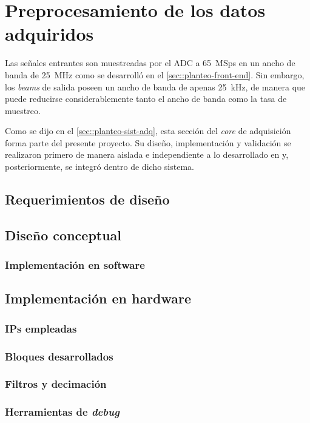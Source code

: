 \documentclass[../../main.tex]{subfiles}
\begin{document}
\graphicspath{{./figures}}
\chapter{Preprocesamiento de los datos adquiridos}
Las señales entrantes son muestreadas por el ADC a 65~MSps en un ancho de banda de 25~MHz como se desarrolló en el \cref{sec::planteo-front-end}. Sin embargo, los \textit{beams} de salida poseen un ancho de banda de apenas 25~kHz, de manera que puede reducirse considerablemente tanto el ancho de banda como la tasa de muestreo.

Como se dijo en el \cref{sec::planteo-sist-adq}, esta sección del \textit{core} de adquisición forma parte del presente proyecto. Su diseño, implementación y validación se realizaron primero de manera aislada e independiente a lo desarrollado en \cite{proyecto-jose} y, posteriormente, se integró dentro de dicho sistema.

\section{Requerimientos de diseño}

\section{Diseño conceptual}

\subsection{Implementación en software}

\section{Implementación en hardware}
\subsection{IPs empleadas}
\subsection{Bloques desarrollados}
\subsection{Filtros y decimación}
\subsection{Herramientas de \textit{debug}}
\end{document}
